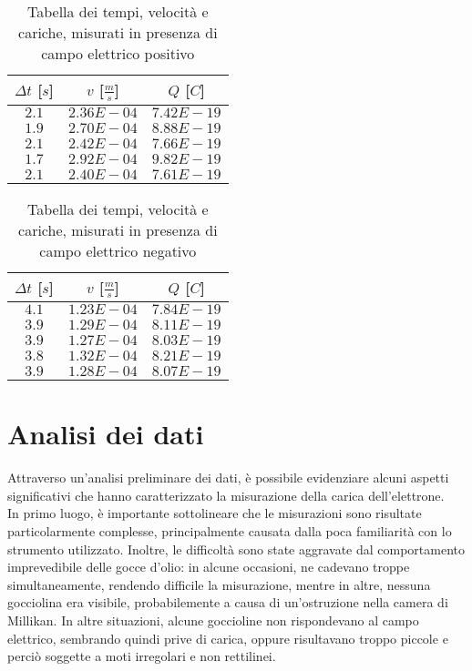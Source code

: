 \documentclass{article}
\begin{document}
\begin{multicols}{2}

\begin{table}[H]
	\centering
	\begin{tabular}{| c | c | c |}
		\hline
		$\Delta t$ [$s$] & $v$ [$\frac ms$] & $Q$ [$C$] \\
		\hline
		$2.1$ & $2.36E-04$ & $7.42E-19$ \\
		$1.9$ & $2.70E-04$ & $8.88E-19$ \\
		$2.1$ & $2.42E-04$ & $7.66E-19$ \\
		$1.7$ & $2.92E-04$ & $9.82E-19$ \\
		$2.1$ & $2.40E-04$ & $7.61E-19$ \\
		\hline
	\end{tabular}
	\caption{Tabella dei tempi, velocità e cariche, misurati in presenza di campo elettrico positivo}
	\label{}
\end{table}

\columnbreak

\begin{table}[H]
	\centering
	\begin{tabular}{| c | c | c |}
		\hline
		$\Delta t$ [$s$] & $v$ [$\frac ms$] & $Q$ [$C$] \\
		\hline
		$4.1$ & $1.23E-04$ & $7.84E-19$ \\
		$3.9$ & $1.29E-04$ & $8.11E-19$ \\
		$3.9$ & $1.27E-04$ & $8.03E-19$ \\
		$3.8$ & $1.32E-04$ & $8.21E-19$ \\
		$3.9$ & $1.28E-04$ & $8.07E-19$ \\
		\hline		
	\end{tabular}
	\caption{Tabella dei tempi, velocità e cariche, misurati in presenza di campo elettrico negativo}
	\label{}
\end{table}
	
\end{multicols}

\section{Analisi dei dati}
Attraverso un'analisi preliminare dei dati, è possibile evidenziare alcuni aspetti significativi che hanno caratterizzato la misurazione della carica dell'elettrone.\\
In primo luogo, è importante sottolineare che le misurazioni sono risultate particolarmente complesse, principalmente causata dalla poca familiarità con lo strumento utilizzato. Inoltre, le difficoltà sono state aggravate dal comportamento imprevedibile delle gocce d'olio: in alcune occasioni, ne cadevano troppe simultaneamente, rendendo difficile la misurazione, mentre in altre, nessuna gocciolina era visibile, probabilemente a causa di un'ostruzione nella camera di Millikan. In altre situazioni, alcune goccioline non rispondevano al campo elettrico, sembrando quindi prive di carica, oppure risultavano troppo piccole e perciò soggette a moti irregolari e non rettilinei.\\
\end{document}
